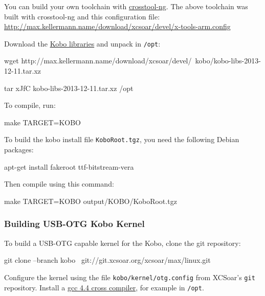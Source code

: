 You can build your own toolchain with
\href{http://crosstool-ng.org/}{crosstool-ng}.  The above toolchain
was built with crosstool-ng and this configuration file:
\url{http://max.kellermann.name/download/xcsoar/devel/x-tools-arm.config}

Download the
\href{http://max.kellermann.name/download/xcsoar/devel/kobo/kobo-libs-2013-12-11.tar.xz}{Kobo
  libraries} and unpack in \texttt{/opt}:

\begin{verbatim*}
wget http://max.kellermann.name/download/xcsoar/devel/\
kobo/kobo-libs-2013-12-11.tar.xz
\end{verbatim*}
\begin{verbatim*}
tar xJfC kobo-libs-2013-12-11.tar.xz /opt
\end{verbatim*}

To compile, run:

\begin{verbatim*}
make TARGET=KOBO
\end{verbatim*}

To build the kobo install file \texttt{KoboRoot.tgz}, you need the
following Debian packages:

\begin{verbatim*}
apt-get install fakeroot ttf-bitstream-vera
\end{verbatim*}

Then compile using this command:

\begin{verbatim*}
make TARGET=KOBO output/KOBO/KoboRoot.tgz
\end{verbatim*}

\subsubsection{Building USB-OTG Kobo Kernel}

To build a USB-OTG capable kernel for the Kobo, clone the git
repository:

\begin{verbatim*}
git clone --branch kobo \
  git://git.xcsoar.org/xcsoar/max/linux.git
\end{verbatim*}

Configure the kernel using the file \texttt{kobo/kernel/otg.config}
from XCSoar's \texttt{git} repository.  Install a
\href{http://openlinux.amlogic.com:8000/download/ARM/gnutools/arm-2010q1-202-arm-none-linux-gnueabi-i686-pc-linux-gnu.tar.bz2}{gcc
  4.4 cross compiler}, for example in \texttt{/opt}.

